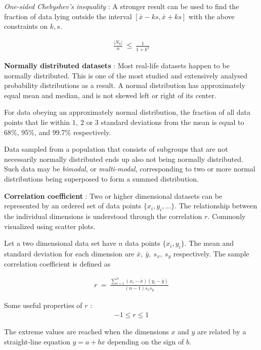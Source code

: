 \textit{One-sided Chebyshev's inequality} : A stronger result can be used to find the fraction of data lying outside the interval  $ [ \bar{x} - ks, \bar{x} + ks ] $ with the above constraints on $ k, s $.

\begin{align}
	\frac{|N_{k}|}{n} \ \leq \ \frac{1}{1 + k^{2}} 
\end{align}

\textbf{Normally distributed datasets} : Most real-life datasets happen to be normally distributed. This is one of the most studied and extensively analysed probability distributions as a result. A normal distribution has approximately equal mean and median, and is not skewed left or right of its center.

For data obeying an approximately normal distribution, the fraction of all data points that lie within $ 1,\ 2 $ or $ 3 $ standard deviations from the mean is equal to 68\%, 95\%, and 99.7\% respectively.

Data sampled from a population that consists of subgroups that are not necessarily normally distributed ends up also not being normally distributed. Such data may be \textit{bimodal}, or \textit{multi-modal}, corresponding to two or more normal distributions being superposed to form a summed distribution.

\textbf{Correlation coefficient} : Two or higher dimensional datasets can be represented by an ordered set of data points $ \{x_i, y_i, ...\} $. The relationship between the individual dimensions is understood through the correlation $ r $. Commonly visualized using scatter plots.

Let a two dimensional data set have $ n $ data points $ \{x_i, y_i\} $. The mean and standard deviation for each dimension are $ \bar{x},\ \bar{y},\ s_x,\ s_y $ respectively. The sample correlation coefficient is defined as 

\begin{align}
	r \ =\ \frac{\sum\limits_{i = 1}^{n} (x_i - \bar{x}) (y_i - \bar{y})}{(n - 1) s_x s_y}
\end{align}

Some useful properties of $ r $ : 
\begin{align}
	-1 \leq r \leq 1
\end{align}
 
The extreme values are reached when the dimensions $ x $ and $ y $ are related by a straight-line equation $ y = a + bx $ depending on the sign of $ b $.

